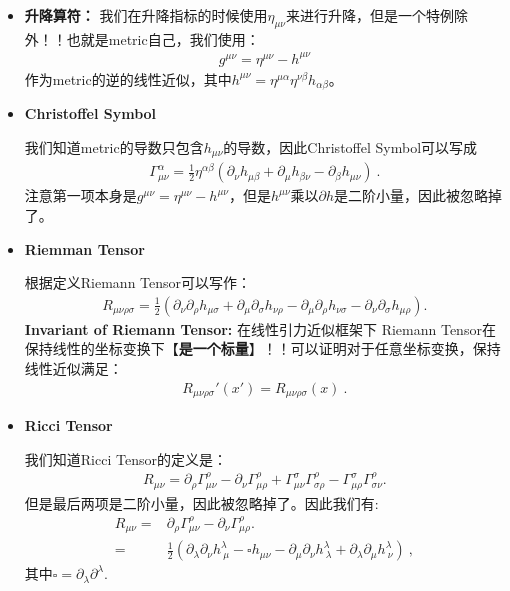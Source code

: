 \begin{itemize}
  \item \textbf{升降算符：} 我们在升降指标的时候使用$ \eta_{\mu\nu}
    $来进行升降，但是一个特例除外！！也就是metric自己，我们使用：
    \begin{align}
      g^{\mu\nu}=\eta^{\mu\nu}-h^{\mu\nu}
    \end{align}
    作为metric的逆的线性近似，其中$ h^{\mu\nu} = \eta^{\mu\alpha}\eta^{\nu\beta}
    h_{\alpha\beta} $。
  \item \textbf{Christoffel Symbol}

    我们知道metric的导数只包含$ h_{\mu\nu} $的导数，因此Christoffel Symbol可以写成
    \begin{align}
      \Gamma_{\mu\nu}^\alpha=\frac{1}{2}\eta^{\alpha\beta}\left(\partial_\nu
      h_{\mu\beta}+\partial_{\mu}h_{\beta\nu}-\partial_{\beta}h_{\mu\nu}\right)\mathrm{~.}
    \end{align}
    注意第一项本身是$ g^{\mu\nu} = \eta^{\mu\nu} - h^{\mu\nu} $，但是$
    h^{\mu\nu} $乘以$ \partial h $是二阶小量，因此被忽略掉了。
  \item \textbf{Riemman Tensor}

    根据定义Riemann Tensor可以写作：
    \begin{align}\label{eq:riemannlinear}
      R_{\mu\nu\rho\sigma}=\frac{1}{2}(\partial_\nu\partial_\rho
        h_{\mu\sigma}+\partial_\mu\partial_\sigma
        h_{\nu\rho}-\partial_\mu\partial_\rho
      h_{\nu\sigma}-\partial_\nu\partial_\sigma h_{\mu\rho}).
    \end{align}
    \textbf{Invariant of Riemann Tensor:} 在线性引力近似框架下 Riemann
    Tensor在保持线性的坐标变换下【\textbf{是一个标量}】！！可以证明对于任意坐标变换，保持线性近似满足：
    \begin{align}
      R_{\mu\nu\rho\sigma}'(x')=R_{\mu\nu\rho\sigma}(x)\mathrm{~.}
    \end{align}
  \item \textbf{Ricci Tensor}

    我们知道Ricci Tensor的定义是：
    \begin{align}
      R_{\mu\nu}=\partial_\rho\Gamma_{\mu\nu}^\rho-\partial_\nu\Gamma_{\mu\rho}^\rho+\Gamma_{\mu\nu}^\sigma\Gamma_{\sigma\rho}^\rho-\Gamma_{\mu\rho}^\sigma\Gamma_{\sigma\nu}^\rho.
    \end{align}
    但是最后两项是二阶小量，因此被忽略掉了。因此我们有:
    \begin{align}
      R_{\mu\nu}=&\partial_\rho\Gamma_{\mu\nu}^\rho-\partial_\nu\Gamma_{\mu\rho}^\rho.\\
      =&\frac{1}{2}\left(\partial_{\lambda}\partial_{\nu}h_{\ \mu}^\lambda-\square
      h_{\mu\nu}-\partial_{\mu}\partial_{\nu}h_{\ \lambda}^\lambda+\partial_{\lambda}\partial_{\mu}h_{\ \nu}^\lambda\right)\mathrm{~,}
    \end{align}
    其中$ \square=\partial_{\lambda}\partial^{\lambda}. $


\end{itemize}
